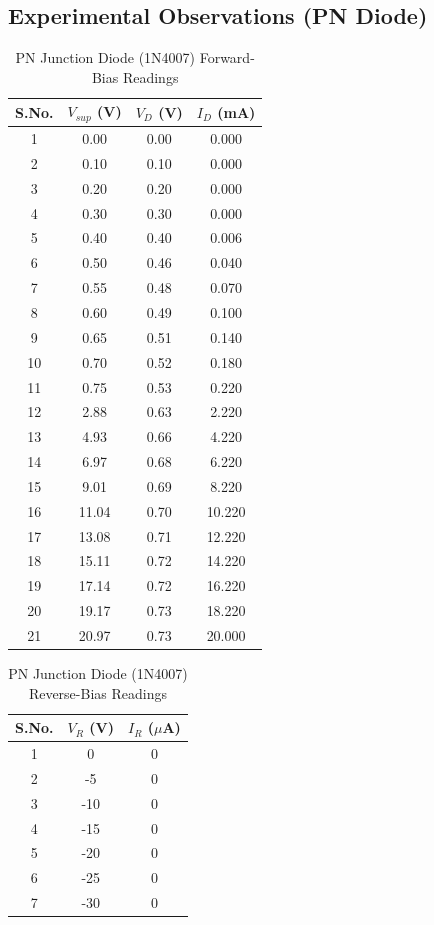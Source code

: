\documentclass[11pt,a4paper]{article}
\begin{document}
\subsection{Experimental Observations (PN Diode)}
\small
\begin{longtable}{c c c c}
\caption{PN Junction Diode (1N4007) Forward-Bias Readings}\label{tab:pn_forward_readings}\\
\toprule
\textbf{S.No.} & $V_{sup}$ (V) & $V_D$ (V) & $I_D$ (mA) \\
\midrule
1 & 0.00 & 0.00 & 0.000 \\
2 & 0.10 & 0.10 & 0.000 \\
3 & 0.20 & 0.20 & 0.000 \\
4 & 0.30 & 0.30 & 0.000 \\
5 & 0.40 & 0.40 & 0.006 \\
6 & 0.50 & 0.46 & 0.040 \\
7 & 0.55 & 0.48 & 0.070 \\
8 & 0.60 & 0.49 & 0.100 \\
9 & 0.65 & 0.51 & 0.140 \\
10 & 0.70 & 0.52 & 0.180 \\
11 & 0.75 & 0.53 & 0.220 \\
12 & 2.88 & 0.63 & 2.220 \\
13 & 4.93 & 0.66 & 4.220 \\
14 & 6.97 & 0.68 & 6.220 \\
15 & 9.01 & 0.69 & 8.220 \\
16 & 11.04 & 0.70 & 10.220 \\
17 & 13.08 & 0.71 & 12.220 \\
18 & 15.11 & 0.72 & 14.220 \\
19 & 17.14 & 0.72 & 16.220 \\
20 & 19.17 & 0.73 & 18.220 \\
21 & 20.97 & 0.73 & 20.000 \\
\bottomrule
\end{longtable}
\begin{longtable}{c c c}
\caption{PN Junction Diode (1N4007) Reverse-Bias Readings}\label{tab:pn_reverse_readings}\\
\toprule
\textbf{S.No.} & $V_R$ (V) & $I_R$ ($\mu$A) \\
\midrule
1 & 0 & 0 \\
2 & -5 & 0 \\
3 & -10 & 0 \\
4 & -15 & 0 \\
5 & -20 & 0 \\
6 & -25 & 0 \\
7 & -30 & 0 \\
\bottomrule
\end{longtable}
\end{document}
